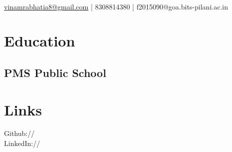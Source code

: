 \documentclass[]{deedy-resume-openfont}
\begin{document}
%
%
\lastupdated

%
%


 \\
\href{mailto:vinamrabhatia8@gmail.com}{vinamrabhatia8@gmail.com} | 8308814380 | f2015090@goa.bits-pilani.ac.in

%
%

\begin{minipage}[t]{0.33\textwidth} 


\section{Education} 

\subsection {\href{http://www.bits-pilani.ac.in/}{} } 
\sectionsep

\subsection{PMS Public School}
\sectionsep


\section{Links} 
Github:// \href{https://github.com/vinamrabhatia}{} \\
LinkedIn://  \href{https://www.linkedin.com/in/vinamrabhatia/}{} \\

\sectionsep



\end{minipage}
\end{document}
